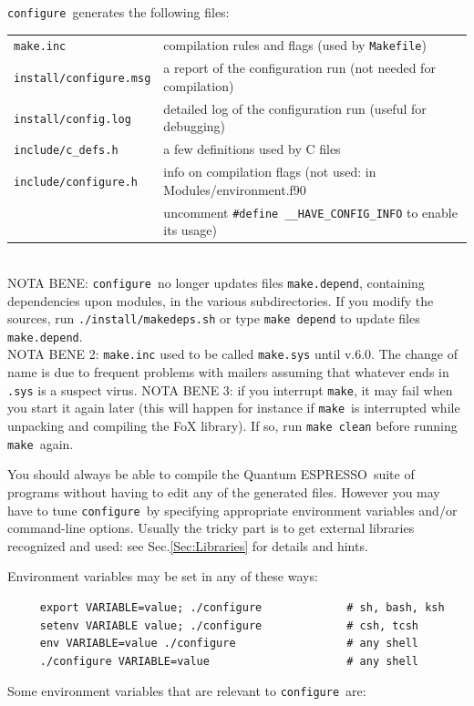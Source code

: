\documentclass[12pt,a4paper]{article}
\def\qe{{\sc Quantum ESPRESSO}}
\def\configure{\texttt{configure}}
\def\make{\texttt{make}}
\begin{document}
\noindent \configure\ generates the following files:

\begin{tabular}{ll}
\texttt{make.inc} &      compilation rules and flags (used by \texttt{Makefile})\\
\texttt{install/configure.msg} & a report of the configuration run (not needed for compilation)\\
\texttt{install/config.log} & detailed log of the configuration run (useful for debugging)\\
\texttt{include/c\_defs.h} &    a few definitions used by C files\\
\texttt{include/configure.h} &  info on compilation flags (not used: in Modules/environment.f90\\
&  uncomment \verb|#define __HAVE_CONFIG_INFO| to enable its usage)\\ \end{tabular}\\
NOTA BENE: \configure\ no longer updates files \texttt{make.depend},
containing dependencies upon modules, in the various subdirectories.
If you modify the sources, run \texttt{./install/makedeps.sh} or type
\texttt{make depend} to update files \texttt{make.depend}.\\
NOTA BENE 2: \texttt{make.inc} used to be called \texttt{make.sys}
until v.6.0. The change of name is due to frequent problems with mailers
assuming that whatever ends in \texttt{.sys} is a suspect virus.
NOTA BENE 3: if you interrupt \make, it may fail when you start it again 
later (this will happen for instance if \make\ is interrupted while unpacking
and compiling the FoX library). If so, run \texttt{make clean} before
running \make\ again.

You should always be able to compile the \qe\ suite
of programs without having to edit any of the generated files. However you
may have to tune \configure\ by specifying appropriate environment variables
and/or command-line options. Usually the tricky part is to get external
libraries recognized and used: see Sec.\ref{Sec:Libraries}
for details and hints.

Environment variables may be set in any of these ways:
\begin{verbatim}
     export VARIABLE=value; ./configure             # sh, bash, ksh
     setenv VARIABLE value; ./configure             # csh, tcsh
     env VARIABLE=value ./configure                 # any shell
     ./configure VARIABLE=value                     # any shell
\end{verbatim}
Some environment variables that are relevant to \configure\ are:
\end{document}
